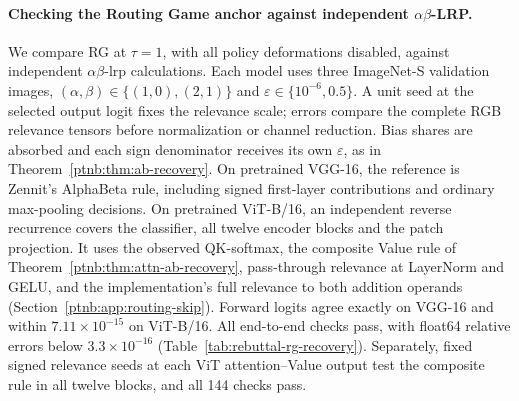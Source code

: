 \paragraph{Checking the Routing Game anchor against independent $\alpha\beta$-LRP.}
We compare RG at $\tau=1$, with all policy deformations disabled, against independent $\alpha\beta$-\ac{lrp} calculations. Each model uses three ImageNet-S validation images, $(\alpha,\beta)\in\{(1,0),(2,1)\}$ and $\varepsilon\in\{10^{-6},0.5\}$. A unit seed at the selected output logit fixes the relevance scale; errors compare the complete RGB relevance tensors before normalization or channel reduction. Bias shares are absorbed and each sign denominator receives its own $\varepsilon$, as in Theorem~\ref{ptnb:thm:ab-recovery}. On pretrained VGG-16, the reference is Zennit's AlphaBeta rule, including signed first-layer contributions and ordinary max-pooling decisions. On pretrained ViT-B/16, an independent reverse recurrence covers the classifier, all twelve encoder blocks and the patch projection. It uses the observed QK-softmax, the composite Value rule of Theorem~\ref{ptnb:thm:attn-ab-recovery}, pass-through relevance at LayerNorm and GELU, and the implementation's full relevance to both addition operands (Section~\ref{ptnb:app:routing-skip}). Forward logits agree exactly on VGG-16 and within $7.11\times10^{-15}$ on ViT-B/16. All end-to-end checks pass, with float64 relative errors below $3.3\times10^{-16}$ (Table~\ref{tab:rebuttal-rg-recovery}). Separately, fixed signed relevance seeds at each ViT attention--Value output test the composite rule in all twelve blocks, and all 144 checks pass.

\begin{table}[htbp]
%
\caption[RG recovery against independent references]{RG recovery against independent $\alpha\beta$-LRP references on pretrained networks. Each entry is the worst error over the stated checks. End-to-end rows use unit output-logit seeds; the block row uses fixed signed relevance seeds.}
\label{tab:rebuttal-rg-recovery}
\end{table}

